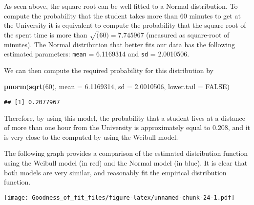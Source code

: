 \documentclass[
]{article}
\newenvironment{Shaded}{\begin{snugshade}}{\end{snugshade}}
\newcommand{\AttributeTok}[1]{\textcolor[rgb]{0.13,0.29,0.53}{#1}}
\newcommand{\ConstantTok}[1]{\textcolor[rgb]{0.56,0.35,0.01}{#1}}
\newcommand{\DecValTok}[1]{\textcolor[rgb]{0.00,0.00,0.81}{#1}}
\newcommand{\FloatTok}[1]{\textcolor[rgb]{0.00,0.00,0.81}{#1}}
\newcommand{\FunctionTok}[1]{\textcolor[rgb]{0.13,0.29,0.53}{\textbf{#1}}}
\newcommand{\NormalTok}[1]{#1}
\newcommand{\SpecialCharTok}[1]{\textcolor[rgb]{0.81,0.36,0.00}{\textbf{#1}}}
\newcommand{\StringTok}[1]{\textcolor[rgb]{0.31,0.60,0.02}{#1}}
\begin{document}
As seen above, the square root can be well fitted to a Normal
distribution. To compute the probability that the student takes more
than 60 minutes to get at the University it is equivalent to compute the
probability that the square root of the spent time is more than
\(\sqrt(60) = 7.745967\) (measured as square-root of minutes). The
Normal distribution that better fits our data has the following
estimated parameters: \texttt{mean} = 6.1169314 and \texttt{sd} =
2.0010506.

We can then compute the required probability for this distribution by

\begin{Shaded}
\begin{Highlighting}[]
\FunctionTok{pnorm}\NormalTok{(}\FunctionTok{sqrt}\NormalTok{(}\DecValTok{60}\NormalTok{), }\AttributeTok{mean =} \FloatTok{6.1169314}\NormalTok{, }\AttributeTok{sd =} \FloatTok{2.0010506}\NormalTok{, }\AttributeTok{lower.tail =} \ConstantTok{FALSE}\NormalTok{)}
\end{Highlighting}
\end{Shaded}

\begin{verbatim}
## [1] 0.2077967
\end{verbatim}

Therefore, by using this model, the probability that a student lives at
a distance of more than one hour from the University is approximately
equal to 0.208, and it is very close to the computed by using the
Weibull model.

The following graph provides a comparison of the estimated distribution
function using the Weibull model (in red) and the Normal model (in
blue). It is clear that both models are very similar, and reasonably fit
the empirical distribution function.

\begin{Shaded}
\end{Shaded}

\texttt{[image: Goodness\_of\_fit\_files/figure-latex/unnamed-chunk-24-1.pdf]}
\end{document}
